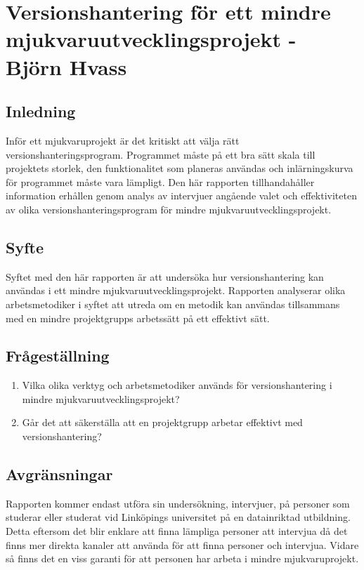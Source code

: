 \chapter{Versionshantering för ett mindre mjukvaruutvecklingsprojekt - Björn Hvass}


%
%
%
%
%
%
%
%
%
%
%

\vspace{3em}
\section{Inledning}
Inför ett mjukvaruprojekt är det kritiskt att välja rätt versionshanteringsprogram. Programmet måste på ett bra sätt skala till projektets storlek, den funktionalitet som planeras användas och inlärningskurva för programmet måste vara lämpligt. Den här rapporten tillhandahåller information erhållen genom analys av intervjuer angående valet och effektiviteten av olika versionshanteringsprogram för mindre mjukvaruutvecklingsprojekt.

\section{Syfte}
Syftet med den här rapporten är att undersöka hur versionshantering kan användas i ett mindre mjukvaruutvecklingsprojekt. Rapporten analyserar olika arbetsmetodiker i syftet att utreda om en metodik kan användas tillsammans med en mindre projektgrupps arbetssätt på ett effektivt sätt.

\section{Frågeställning}
\begin{enumerate}
    \item Vilka olika verktyg och arbetsmetodiker används för versionshantering i mindre mjukvaruutvecklingsprojekt?
    \item Går det att säkerställa att en projektgrupp arbetar effektivt med versionshantering?
\end{enumerate}

\section{Avgränsningar}
Rapporten kommer endast utföra sin undersökning, intervjuer, på personer som studerar eller studerat vid Linköpings universitet på en datainriktad utbildning. Detta eftersom det blir enklare att finna lämpliga personer att intervjua då det finns mer direkta kanaler att använda för att finna personer och intervjua. Vidare så finns det en viss garanti för att personen har arbeta i mindre mjukvaruprojekt.

